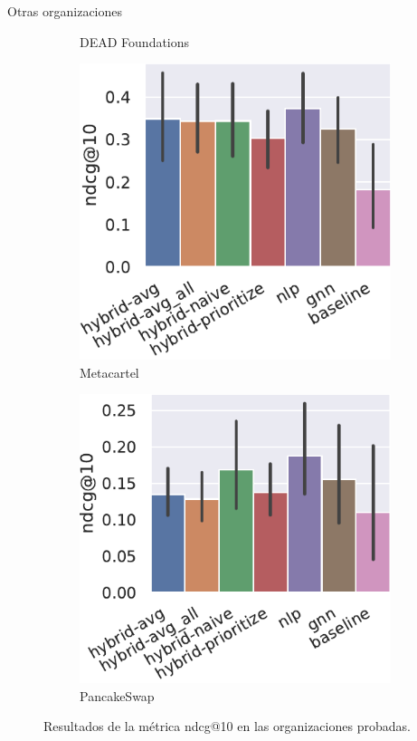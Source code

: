 \begin{frame}{Otras organizaciones}
\begin{figure}
\begin{subfigure}{.24\linewidth}
        \caption{DEAD Foundations}
        \label{fig:all-results-ndcg-dead_foundation}
    \end{subfigure}\hfill\begin{subfigure}{.24\linewidth}
        \includegraphics[width=\linewidth]{./images/graphs/7_all-metrics-MetaCartel - MetaCartel Ventures-ndcg@10.pdf}
        \caption{Metacartel}
    \end{subfigure}\hfill\begin{subfigure}{.24\linewidth}
        \includegraphics[width=\linewidth]{./images/graphs/7_all-metrics-PancakeSwap-ndcg@10.pdf}
        \caption{PancakeSwap}
    \end{subfigure}
    \caption{Resultados de la métrica ndcg@10 en las organizaciones probadas.}
    \label{fig:all-results-ndcg}
\end{figure}
\end{frame}
